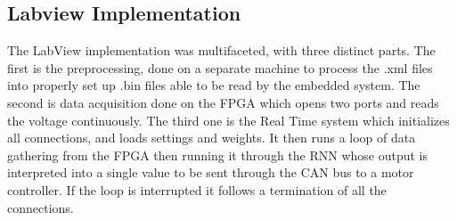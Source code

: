 \subsection{Labview Implementation}
The LabView implementation was multifaceted, with three distinct parts. The first is the preprocessing, done on a separate machine to process the .xml files into properly set up .bin files able
to be read by the embedded system. The second is data acquisition done on the \acrfull{FPGA} which opens two ports and reads the voltage continuously. The third one is the Real Time system which
initializes all connections, and loads settings and weights. It then runs a loop of data gathering from the \acrshort{FPGA} then running it through the RNN whose output is interpreted into a single 
value to be sent through the CAN bus to a motor controller. If the loop is interrupted it follows a termination of all the connections.